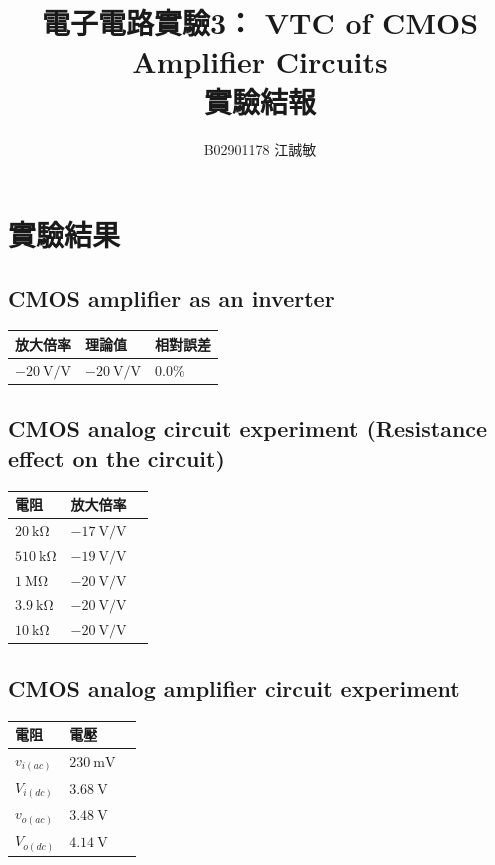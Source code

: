 \documentclass[12pt, a4paper]{article}
\title{ \bf {\Huge 電子電路實驗3： VTC of CMOS Amplifier Circuits  }\\ 實驗結報}
\author{B02901178 江誠敏}
\begin{document}
\maketitle


\section{實驗結果}

\subsection{CMOS amplifier as an inverter}
\begin{center}
	\begin{tabular}{p{3cm}p{3cm}p{3cm}}
	\hline
	放大倍率 & 理論值 & 相對誤差 \\
	\hline 
	\hline
  $\SI{-20}{\volt \per \volt}$ & $\SI{-20}{\volt \per \volt}$ & $0.0\%$
  \end{tabular}
\end{center}

\subsection{CMOS analog circuit experiment (Resistance effect on the circuit)}
\begin{center}
	\begin{tabular}{p{3cm}p{3cm}p{3cm}}
	\hline
  電阻 & 放大倍率 \\
	\hline 
	\hline
  $\SI{20}\kohm$ & $\SI{-17}{\volt\per\volt}$ \\
  $\SI{510}\kohm$ & $\SI{-19}{\volt\per\volt}$ \\
  $\SI{1}\Mohm$ & $\SI{-20}{\volt\per\volt}$ \\
  $\SI{3.9}\kohm$ & $\SI{-20}{\volt\per\volt}$ \\
  $\SI{10}\kohm$ & $\SI{-20}{\volt\per\volt}$ \\
  \end{tabular}
\end{center}

\subsection{CMOS analog amplifier circuit experiment}

\begin{center}
	\begin{tabular}{p{3cm}p{3cm}p{3cm}}
	\hline
  電阻 & 電壓 \\
	\hline 
	\hline
  $v_{i(ac)}$ & $\SI{230}\mV$ \\
  $V_{i(dc)}$ & $\SI{3.68}\V$ \\
  $v_{o(ac)}$ & $\SI{3.48}\V$ \\
  $V_{o(dc)}$ & $\SI{4.14}\V$ \\
  \end{tabular}
\end{center}
\end{document}
